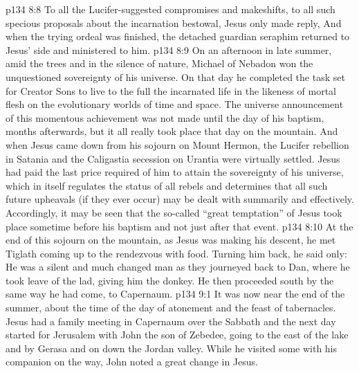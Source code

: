 \vs p134 8:8 To all the Lucifer\hyp{}suggested compromises and makeshifts, to all such specious proposals about the incarnation bestowal, Jesus only made reply,  And when the trying ordeal was finished, the detached guardian seraphim returned to Jesus’ side and ministered to him.
\vs p134 8:9 \pc On an afternoon in late summer, amid the trees and in the silence of nature, Michael of Nebadon won the unquestioned sovereignty of his universe. On that day he completed the task set for Creator Sons to live to the full the incarnated life in the likeness of mortal flesh on the evolutionary worlds of time and space. The universe announcement of this momentous achievement was not made until the day of his baptism, months afterwards, but it all really took place that day on the mountain. And when Jesus came down from his sojourn on Mount Hermon, the Lucifer rebellion in Satania and the Caligastia secession on Urantia were virtually settled. Jesus had paid the last price required of him to attain the sovereignty of his universe, which in itself regulates the status of all rebels and determines that all such future upheavals (if they ever occur) may be dealt with summarily and effectively. Accordingly, it may be seen that the so\hyp{}called “great temptation” of Jesus took place sometime before his baptism and not just after that event.
\vs p134 8:10 At the end of this sojourn on the mountain, as Jesus was making his descent, he met Tiglath coming up to the rendezvous with food. Turning him back, he said only:  He was a silent and much changed man as they journeyed back to Dan, where he took leave of the lad, giving him the donkey. He then proceeded south by the same way he had come, to Capernaum.
\vs p134 9:1 It was now near the end of the summer, about the time of the day of atonement and the feast of tabernacles. Jesus had a family meeting in Capernaum over the Sabbath and the next day started for Jerusalem with John the son of Zebedee, going to the east of the lake and by Gerasa and on down the Jordan valley. While he visited some with his companion on the way, John noted a great change in Jesus.
